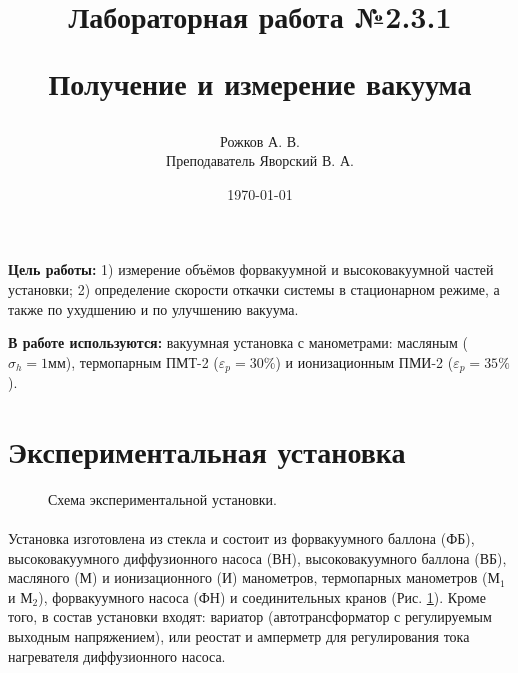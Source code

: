 \documentclass[a4paper, 12pt]{article}
\title{\begin{center}Лабораторная работа №2.3.1\end{center}
Получение и измерение вакуума}
\author{Рожков А. В. \\ Преподаватель Яворский В. А.}
\date{\today}
\begin{document}
    \maketitle
    \newpage

    \textbf{Цель работы:} 1) измерение объёмов форвакуумной и высоковакуумной частей установки; 2) определение скорости откачки системы в стационарном режиме, а также по ухудшению и по улучшению вакуума.

    \textbf{В работе используются:} вакуумная установка с манометрами: масляным ($\sigma_h = 1 мм$), термопарным ПМТ-2 ($\varepsilon_{p} = 30\%$) и ионизационным ПМИ-2 ($\varepsilon_{p} = 35\%$).

    \section{Экспериментальная установка}

    \begin{figure}[h]
        \caption{Схема экспериментальной установки.}
        \label{ris:ustanovka}
    \end{figure}

    \paragraph{}
    Установка изготовлена из стекла и состоит из форвакуумного баллона (ФБ), высоковакуумного диффузионного насоса (ВН), высоковакуумного баллона (ВБ), масляного (М) и ионизационного (И) манометров, термопарных манометров ($М_1$ и $М_2$), форвакуумного насоса (ФН) и соединительных кранов (Рис. \ref{ris:ustanovka}). Кроме того, в состав установки входят: вариатор (автотрансформатор с регулируемым выходным напряжением), или реостат и амперметр для регулирования тока нагревателя диффузионного насоса.
\end{document}
